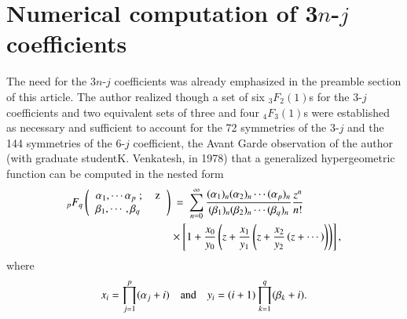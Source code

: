 \section*{Numerical computation of 3$n$-$j$ coefficients}

The need for the 3$n$-$j$ coefficients was already emphasized in the preamble section of this article. The author realized though a set of six $_3F_2(1)$s for the 3-$j$ coefficients and two equivalent sets of three and four $_4F_3(1)$s were established as necessary and sufficient to account for the 72 symmetries of the 3-$j$ and the 144 symmetries of the 6-$j$ coefficient, the Avant Garde observation of the author (with graduate student\break K. Venkatesh, in 1978) that a generalized hypergeometric function can be computed in the nested form
\begin{equation}
\begin{split}
{}_pF_q
\left( 
\begin{tabular}{lr} 
$\alpha_1,\cdots \alpha_p\ ;$ & z\\
$\beta_1,\cdots, \beta_q $& \\ 
\end{tabular} 
\right) & \ =\ \sum_{n=0}^\infty 
\frac{(\alpha_1)_n (\alpha_2)_n \cdots (\alpha_p)_n}{(\beta_1)_n (\beta_2)_n \cdots (\beta_q)_n}
\frac{z^n}{n!}\\
& \times \left[ 1 + \frac{x_0}{y_0}\left(z + \frac{x_1}{y_1}\left( z + \frac{x_2}{y_2}\left(z + \cdots 
\right) \right) \right) \right], \label{chap7-eq59}
\end{split}
\end{equation}
where
\begin{equation}
x_i=\prod_{j=1}^p (\alpha_j + i)\quad {\rm and}\quad y_i= (i+1)\prod_{k=1}^q (\beta_k + i).\label{chap7-eq60}
\end{equation}

